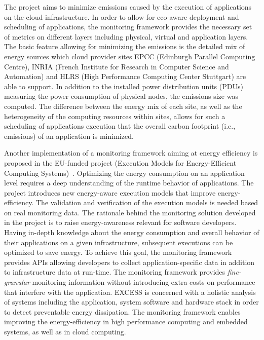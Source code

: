 \documentclass[10pt,letterpaper]{IEEEtran}
\begin{document}
The \ECO project aims to minimize  emissions caused by the execution of applications on the cloud
infrastructure. In order to allow for eco-aware deployment and scheduling of applications,
the \ECO monitoring framework provides the necessary set of metrics on different layers including physical,
virtual and application layers. The basic feature allowing for minimizing the
 emissions is the detailed mix of energy sources which cloud provider sites
EPCC (Edinburgh Parallel Computing Centre), INRIA (French Institute for Research in
Computer Science and Automation) and HLRS (High Performance Computing Center Stuttgart)
are able to support. In addition to the installed power distribution units (PDUs) measuring
the power consumption of physical nodes, the emissions size was computed.
The difference between the energy mix of each site, as well as the
heterogeneity of the computing resources within sites, allows for such
a scheduling of applications execution that the overall carbon footprint (i.e.,  emissions)
of an application is minimized.

Another implementation of a monitoring framework aiming at energy efficiency
is proposed in the EU-funded project \EXCESS (Execution Models
for Energy-Efficient Computing Systems)~\cite{koller14}.
Optimizing the energy consumption on an application level requires a deep understanding of the runtime behavior of applications.
The \EXCESS project introduces new energy-aware execution models that improve energy-efficiency.
The validation and verification of the execution models is needed based on real monitoring data.
The rationale behind the monitoring solution developed in the \EXCESS project is to
raise energy-awareness relevant for software developers. Having in-depth
knowledge about the energy consumption and overall behavior of their applications on a given infrastructure,
subsequent executions can be optimized to save energy. To achieve this goal, the \EXCESS monitoring framework
provides APIs allowing developers to collect application-specific data in addition to infrastructure data at run-time.
The \EXCESS monitoring framework provides \emph{fine-granular} monitoring information
without introducing extra costs on performance that interfere with the application.
EXCESS is concerned with a holistic analysis of systems including the application,
system software and hardware stack in order to detect preventable energy dissipation.
The \EXCESS monitoring framework enables improving the energy-efficiency in high performance computing
and embedded systems, as well as in cloud computing.
\end{document}
